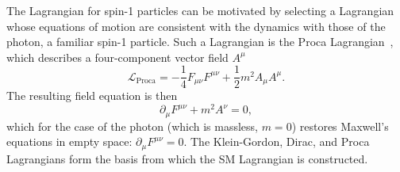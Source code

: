 The Lagrangian for spin-1 particles can be motivated by selecting a Lagrangian whose equations of motion are consistent with the dynamics with those of the photon, a familiar spin-1 particle.
Such a Lagrangian is the Proca Lagrangian~\cite{Griffiths:2008zz}, which describes a four-component vector field $A^\mu$
\begin{equation} \label{eqn:proca_lagrangian}
    \mathcal L_{\text{Proca}} = -\frac{1}{4} F_{\mu \nu}F^{\mu \nu} + \frac{1}{2} m^2 A_\mu A^\mu.
\end{equation}
The resulting field equation is then~\cite{Griffiths:2008zz}
\begin{equation}
    \partial_\mu F^{\mu\nu} + m^2A^\nu = 0,
\end{equation}
which for the case of the photon (which is massless, $m=0$) restores Maxwell's equations in empty space: $\partial_\mu F^{\mu\nu} = 0$.
The Klein-Gordon, Dirac, and Proca Lagrangians form the basis from which the SM Lagrangian is constructed.
